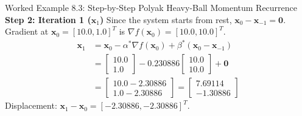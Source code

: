 \begin{examplebox}[breakable]{Worked Example 8.3: Step-by-Step Polyak Heavy-Ball Momentum Recurrence}
\textbf{Step 2: Iteration 1 ($\mathbf{x}_1$)}
Since the system starts from rest, $\mathbf{x}_0 - \mathbf{x}_{-1} = \mathbf{0}$.
Gradient at $\mathbf{x}_0 = [10.0, 1.0]^T$ is $\nabla f(\mathbf{x}_0) = [10.0, 10.0]^T$.
\begin{align}
\mathbf{x}_1 &= \mathbf{x}_0 - \alpha^* \nabla f(\mathbf{x}_0) + \beta^*(\mathbf{x}_0 - \mathbf{x}_{-1}) \nonumber \\
&= \begin{bmatrix} 10.0 \\ 1.0 \end{bmatrix} - 0.230886 \begin{bmatrix} 10.0 \\ 10.0 \end{bmatrix} + \mathbf{0} \nonumber \\
&= \begin{bmatrix} 10.0 - 2.30886 \\ 1.0 - 2.30886 \end{bmatrix} = \begin{bmatrix} 7.69114 \\ -1.30886 \end{bmatrix}
\end{align}
Displacement: $\mathbf{x}_1 - \mathbf{x}_0 = [-2.30886, -2.30886]^T$.


\end{examplebox}
